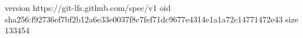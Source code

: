 version https://git-lfs.github.com/spec/v1
oid sha256:f92736ef7bf2b12a6e33e0037f8c7fef71dc9677e4314e1a1a72c14771472e43
size 133454
